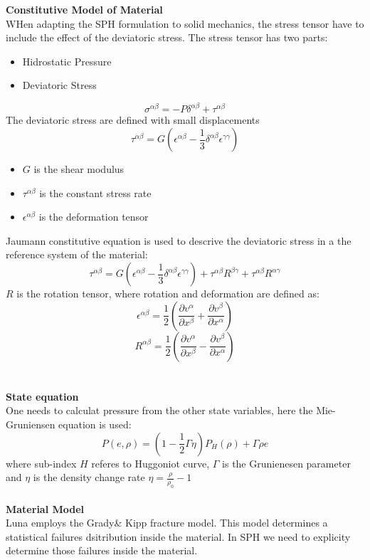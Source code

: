 \documentclass[12pt]{book}
\begin{document}
\textbf{Constitutive Model of Material}\\
WHen adapting the SPH formulation to solid mechanics, the stress tensor have to include the effect of the deviatoric stress. The stress tensor has two parts:
\begin{itemize}
\item Hidrostatic Pressure
\item Deviatoric Stress
\end{itemize}
\[\sigma^{\alpha\beta}=-P\delta^{\alpha\beta}+\tau^{\alpha\beta}\]
The deviatoric stress are defined with small displacements
\[\tau^{\dot{\alpha}\beta}=G\left(\epsilon^{\alpha\beta}-\frac{1}{3}\delta^{\alpha\beta}\epsilon^{\gamma\gamma}\right)\]
\begin{itemize}
\item $G$ is the shear modulus
\item $\tau^{\alpha\beta}$ is the constant stress rate
\item $\epsilon^{\alpha\beta}$ is the deformation tensor
\end{itemize}
Jaumann constitutive equation is used to descrive the deviatoric stress in a the reference system of the material:
\[\tau^{\dot{\alpha}\beta}=G\left(\epsilon^{\alpha\beta}-\frac{1}{3}\delta^{\alpha\beta}\epsilon^{\gamma\gamma}\right)+\tau^{\alpha\beta}R^{\beta\gamma}+\tau^{\alpha\beta}R^{\alpha\gamma}\]
$R$ is the rotation tensor, where rotation and deformation are defined as:
\[\epsilon^{\alpha\beta}=\frac{1}{2}\left(\frac{\partial v^\alpha}{\partial x^\beta}+\frac{\partial v^\beta}{\partial x^\alpha}\right)\]
\[R^{\alpha\beta}=\frac{1}{2}\left(\frac{\partial v^\alpha}{\partial x^\beta}-\frac{\partial v^\beta}{\partial x^\alpha}\right)\]
\\ \\
\textbf{State equation}\\
One needs to calculat pressure from the other state variables, here the Mie-Gruniensen equation is used:
\[P(e,\rho)=\left(1-\frac{1}{2}\Gamma\eta\right)P_H(\rho)+\Gamma\rho e\]
where sub-index $H$ referes to Huggoniot curve, $\Gamma$ is the Grunienesen parameter and $\eta$ is the density change rate $\eta=\frac{\rho}{\rho_0}-1$
\\ \\
\textbf{Material Model}\\ 
Luna employs the Grady\& Kipp fracture model. This model determines a statistical failures dsitribution inside the material. In SPH we need to explicity determine those failures inside the material.\cite{Luna_SPH}
\end{document}

